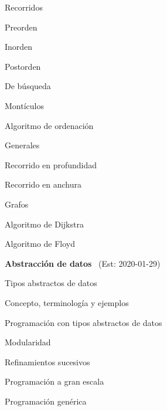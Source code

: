 \begin{longenum}
\begin{longenum}
\begin{longenum}
\begin{longenum}
                \item Recorridos
                \begin{longenum}
                    \item Preorden
                    \item Inorden
                    \item Postorden
                \end{longenum}
            \end{longenum}
            \item De búsqueda
            \item Montículos
            \begin{longenum}
                \item Algoritmo de ordenación
            \end{longenum}
            \item Generales
            \begin{longenum}
                \item Recorrido en profundidad
                \item Recorrido en anchura
            \end{longenum}
        \end{longenum}
        \item Grafos
        \begin{longenum}
            \item Algoritmo de Dijkstra
            \item Algoritmo de Floyd
        \end{longenum}
    \end{longenum}
    \item \textbf{Abstracción de datos} \ (Est: 2020-01-29)
    \begin{longenum}
        \item Tipos abstractos de datos
        \begin{longenum}
            \item Concepto, terminología y ejemplos
            \item Programación con tipos abstractos de datos
            \begin{longenum}
                \item Modularidad
                \item Refinamientos sucesivos
                \item Programación a gran escala
                \item Programación genérica

\end{longenum}
\end{longenum}
\end{longenum}
\end{longenum}
